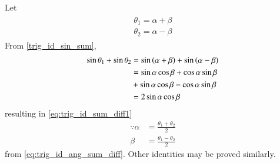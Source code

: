 \begin{enumerate}[label=\arabic*.,ref=\thesubsection.\theenumi]
\solution Let 
%
\begin{align}
\label{eq:trig_id_ang_sum_diff}
\begin{split}
\theta_1 = \alpha + \beta
\\
\theta_2 = \alpha - \beta
\end{split}
\end{align}
%
From \eqref{trig_id_sin_sum},
%
\begin{align}
\sin \theta_1 + \sin \theta_2  &= \sin \left(\alpha + \beta\right) + \sin \left(\alpha - \beta\right)
\\
&= \sin \alpha \cos \beta + \cos \alpha \sin \beta 
\\
&+\sin \alpha \cos \beta - \cos \alpha \sin \beta
\\
&= 2 \sin \alpha \cos \beta
\end{align}
%
resulting in \eqref{eq:trig_id_sum_diff1}
%
\begin{align}
\because \alpha &= \frac{\theta_1 +\theta_2}{2}
\\
\beta &= \frac{\theta_1 -\theta_2}{2}
\end{align}
from \eqref{eq:trig_id_ang_sum_diff}.  Other identities may be proved similarly.
%
%

\end{enumerate}
